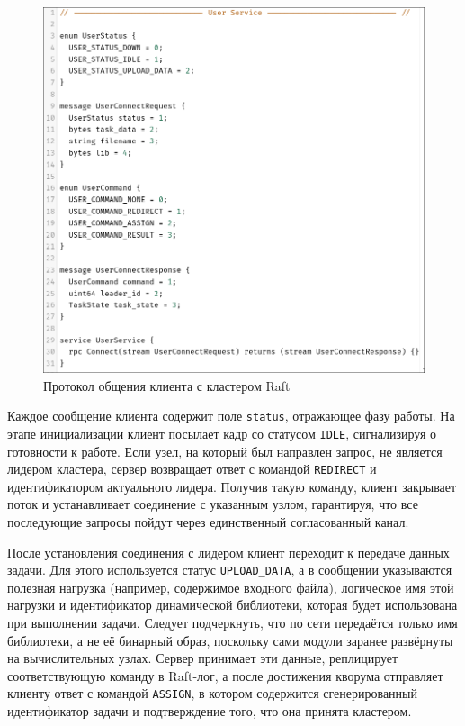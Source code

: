 \begin{figure}
  \centering
  \includegraphics[scale=0.4]{inc/user-proto.png}
  \caption{Протокол общения клиента с кластером Raft}
  \label{fig:user_proto}
\end{figure}

Каждое сообщение клиента содержит поле \texttt{status}, отражающее фазу работы.
На этапе инициализации клиент посылает кадр со статусом \texttt{IDLE},
сигнализируя о готовности к работе. Если узел, на который был направлен запрос,
не является лидером кластера, сервер возвращает ответ с командой \texttt{REDIRECT}
и идентификатором актуального лидера. Получив такую команду, клиент закрывает
поток и устанавливает соединение с указанным узлом, гарантируя, что все
последующие запросы пойдут через единственный согласованный канал.

После установления соединения с лидером клиент переходит к передаче данных
задачи. Для этого используется статус \texttt{UPLOAD\_DATA}, а в сообщении
указываются полезная нагрузка (например, содержимое входного файла),
логическое имя этой нагрузки и идентификатор динамической библиотеки, которая
будет использована при выполнении задачи. Следует подчеркнуть, что по сети
передаётся только имя библиотеки, а не её бинарный образ, поскольку сами
модули заранее развёрнуты на вычислительных узлах. Сервер принимает эти данные,
реплицирует соответствующую команду в Raft-лог, а после достижения кворума
отправляет клиенту ответ с командой \texttt{ASSIGN}, в котором содержится
сгенерированный идентификатор задачи и подтверждение того, что она принята
кластером.

